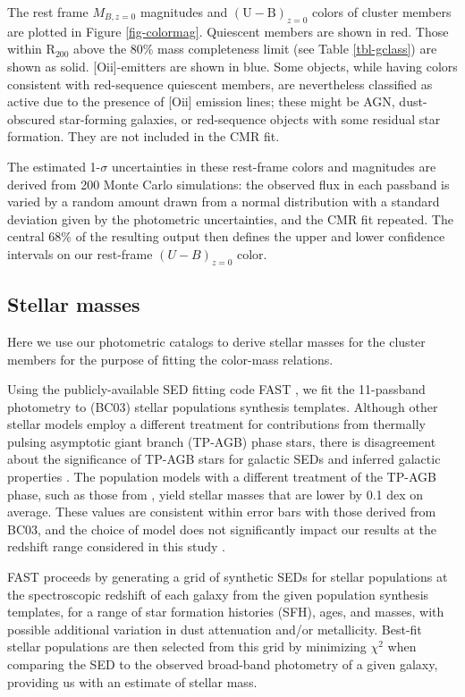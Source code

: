 The rest frame $M_{B,z=0}$ magnitudes and $\mathrm{(U-B)}_{z=0}$ colors of cluster members are plotted in Figure \ref{fig-colormag}. Quiescent members are shown in red. Those within R$_{200}$ above the 80\% mass completeness limit (see Table \ref{tbl-gclass}) are shown as solid. [O{\sc ii}]-emitters are shown in blue. Some objects, while having colors consistent with red-sequence quiescent members, are nevertheless classified as active due to the presence of [O{\sc ii}] emission lines; these might be AGN, dust-obscured star-forming galaxies, or red-sequence objects with some residual star formation. They are not included in the CMR fit.

The estimated 1-$\sigma$ uncertainties in these rest-frame colors and magnitudes are derived from 200 Monte Carlo simulations: the observed flux in each passband is varied by a random amount drawn from a normal distribution with a standard deviation given by the photometric uncertainties, and the CMR fit repeated.
The central 68\% of the resulting output then defines the upper and lower confidence intervals on our rest-frame $(U-B)_{z=0}$ color.

\subsection{Stellar masses}\label{sec-stellar_masses}

Here we use our photometric catalogs to derive stellar masses for the cluster members for the purpose of fitting the color-mass relations.

Using the publicly-available SED fitting code FAST \citep{Kriek:2009eq}, we fit the 11-passband photometry to \citet{Bruzual:2003ge} (BC03) stellar populations synthesis templates. Although other stellar models employ a different treatment for contributions from thermally pulsing asymptotic giant branch (TP-AGB) phase stars, there is disagreement about the significance of TP-AGB stars for galactic SEDs and inferred galactic properties \citep{Kriek:2010fq}. The population models with a different treatment of the TP-AGB phase, such as those from \citet{Maraston:2005oj}, yield stellar masses that are lower by 0.1 dex on average. These values are consistent within error bars with those derived from BC03, and the choice of model does not significantly impact our results at the redshift range considered in this study \citep[see e.g.][]{Rettura:2006gb}.

FAST proceeds by generating a grid of synthetic SEDs for stellar populations at the spectroscopic redshift of each galaxy from the given population synthesis templates, for a range of star formation histories (SFH), ages, and masses, with possible additional variation in dust attenuation and/or metallicity. Best-fit stellar populations are then selected from this grid by minimizing ${\chi}^2$ when comparing the SED to the observed broad-band photometry of a given galaxy, providing us with an estimate of stellar mass.

